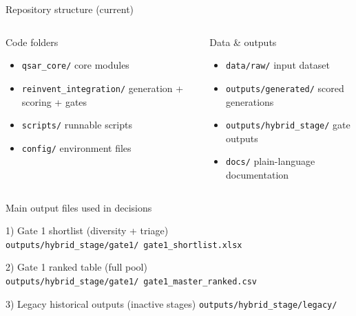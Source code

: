 \documentclass[aspectratio=169,10pt]{beamer}
\begin{document}
\begin{frame}{Repository structure (current)}
  \begin{columns}[T]
      \begin{block}{Code folders}
        \begin{itemize}
          \item \texttt{qsar\_core/} core modules
          \item \texttt{reinvent\_integration/} generation + scoring + gates
          \item \texttt{scripts/} runnable scripts
          \item \texttt{config/} environment files
        \end{itemize}
      \end{block}
      \begin{block}{Data \& outputs}
        \begin{itemize}
          \item \texttt{data/raw/} input dataset
          \item \texttt{outputs/generated/} scored generations
          \item \texttt{outputs/hybrid\_stage/} gate outputs
          \item \texttt{docs/} plain-language documentation
        \end{itemize}
      \end{block}
  \end{columns}
\end{frame}

\begin{frame}{Main output files used in decisions}
  \small
  \begin{block}{1) Gate 1 shortlist (diversity + triage)}
    \texttt{outputs/hybrid\_stage/gate1/}\
    \texttt{gate1\_shortlist.xlsx}
  \end{block}

  \begin{block}{2) Gate 1 ranked table (full pool)}
    \texttt{outputs/hybrid\_stage/gate1/}\
    \texttt{gate1\_master\_ranked.csv}
  \end{block}

  \begin{block}{3) Legacy historical outputs (inactive stages)}
    \texttt{outputs/hybrid\_stage/legacy/}
  \end{block}
\end{frame}

\end{document}
